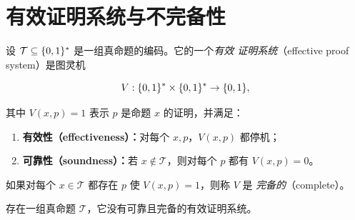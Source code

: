 \section{有效证明系统与不完备性}

\begin{definition}[有效证明系统]
  \label{def:effective-proof-system}
  设 $\mathcal T\subseteq\{0,1\}^{*}$ 是一组真命题的编码。它的一个\emph{有效
  证明系统}（effective proof system）是图灵机

  \[
    V:\{0,1\}^{*}\times\{0,1\}^{*}\to\{0,1\},
  \]

  其中 $V(x,p)=1$ 表示 $p$ 是命题 $x$ 的证明，并满足：

  \begin{enumerate}[label=\arabic*.]
    \item \textbf{有效性（effectiveness）：}对每个 $x,p$，$V(x,p)$ 都停机；
    \item \textbf{可靠性（soundness）：}若 $x\notin\mathcal T$，则对每个 $p$
      都有 $V(x,p)=0$。
  \end{enumerate}

  如果对每个 $x\in\mathcal T$ 都存在 $p$ 使 $V(x,p)=1$，则称 $V$ 是
  \emph{完备的}（complete）。
\end{definition}

\begin{theorem}[抽象不完备性]
  \label{thm:abstract-incompleteness}
  存在一组真命题 $\mathcal T$，它没有可靠且完备的有效证明系统。
\end{theorem}

